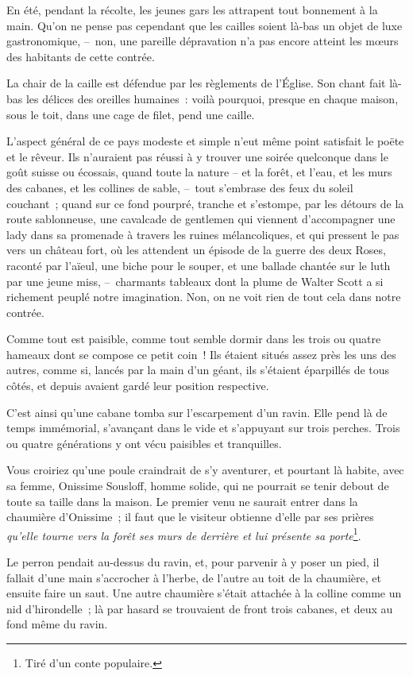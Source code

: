 \documentclass[french,twoside]{book} %
\begin{document}
En été, pendant la récolte, les jeunes gars les attrapent tout bonnement à la main. Qu’on ne pense pas cependant que les cailles soient là-bas un objet de luxe gastronomique, – non, une pareille dépravation n’a pas encore atteint les mœurs des habitants de cette contrée.\par
La chair de la caille est défendue par les règlements de l’Église. Son chant fait là-bas les délices des oreilles humaines : voilà pourquoi, presque en chaque maison, sous le toit, dans une cage de filet, pend une caille.\par
L’aspect général de ce pays modeste et simple n’eut même point satisfait le poëte et le rêveur. Ils n’auraient pas réussi à y trouver une soirée quelconque dans le goût suisse ou écossais, quand toute la nature – et la forêt, et l’eau, et les murs des cabanes, et les collines de sable, – tout s’embrase des feux du soleil couchant ; quand sur ce fond pourpré, tranche et s’estompe, par les détours de la route sablonneuse, une cavalcade de gentlemen qui viennent d’accompagner une lady dans sa promenade à travers les ruines mélancoliques, et qui pressent le pas vers un château fort, où les attendent un épisode de la guerre des deux Roses, raconté par l’aïeul, une biche pour le souper, et une ballade chantée sur le luth par une jeune miss, – charmants tableaux dont la plume de Walter Scott a si richement peuplé notre imagination. Non, on ne voit rien de tout cela dans notre contrée.\par
Comme tout est paisible, comme tout semble dormir dans les trois ou quatre hameaux dont se compose ce petit coin ! Ils étaient situés assez près les uns des autres, comme si, lancés par la main d’un géant, ils s’étaient éparpillés de tous côtés, et depuis avaient gardé leur position respective.\par
C’est ainsi qu’une cabane tomba sur l’escarpement d’un ravin. Elle pend là de temps immémorial, s’avançant dans le vide et s’appuyant sur trois perches. Trois ou quatre générations y ont vécu paisibles et tranquilles.\par
Vous croiriez qu’une poule craindrait de s’y aventurer, et pourtant là habite, avec sa femme, Onissime Sousloff, homme solide, qui ne pourrait se tenir debout de toute sa taille dans la maison. Le premier venu ne saurait entrer dans la chaumière d’Onissime ; il faut que le visiteur obtienne d’elle par ses prières \emph{qu’elle tourne vers la forêt ses murs de derrière et lui présente sa porte}\footnote{Tiré d’un conte populaire.}.\par
Le perron pendait au-dessus du ravin, et, pour parvenir à y poser un pied, il fallait d’une main s’accrocher à l’herbe, de l’autre au toit de la chaumière, et ensuite faire un saut. Une autre chaumière s’était attachée à la colline comme un nid d’hirondelle ; là par hasard se trouvaient de front trois cabanes, et deux au fond même du ravin.\par
\end{document}
